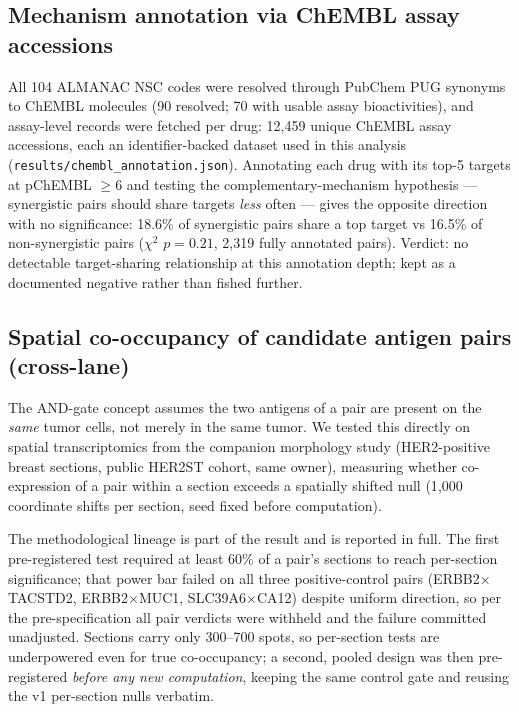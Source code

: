 \documentclass[11pt]{article}
\begin{document}
\subsection{Mechanism annotation via ChEMBL assay accessions}
All 104 ALMANAC NSC codes were resolved through PubChem PUG synonyms to ChEMBL
molecules (90 resolved; 70 with usable assay bioactivities), and assay-level
records were fetched per drug: 12{,}459 unique ChEMBL assay accessions, each an
identifier-backed dataset used in this analysis
(\texttt{results/chembl\_annotation.json}). Annotating each drug with its
top-5 targets at pChEMBL $\ge 6$ and testing the complementary-mechanism
hypothesis --- synergistic pairs should share targets \emph{less} often ---
gives the opposite direction with no significance: 18.6\% of synergistic pairs
share a top target vs 16.5\% of non-synergistic pairs ($\chi^2$ $p=0.21$,
2{,}319 fully annotated pairs). Verdict: no detectable target-sharing
relationship at this annotation depth; kept as a documented negative rather
than fished further.
\subsection{Spatial co-occupancy of candidate antigen pairs (cross-lane)}
The AND-gate concept assumes the two antigens of a pair are present on the
\emph{same} tumor cells, not merely in the same tumor. We tested this directly
on spatial transcriptomics from the companion morphology study (HER2-positive
breast sections, public HER2ST cohort, same owner), measuring whether
co-expression of a pair within a section exceeds a spatially shifted null
(1{,}000 coordinate shifts per section, seed fixed before computation).

The methodological lineage is part of the result and is reported in full. The
first pre-registered test required at least 60\% of a pair's sections to reach
per-section significance; that power bar failed on all three positive-control
pairs (ERBB2$\times$TACSTD2, ERBB2$\times$MUC1, SLC39A6$\times$CA12) despite
uniform direction, so per the pre-specification all pair verdicts were withheld
and the failure committed unadjusted. Sections carry only 300--700 spots, so
per-section tests are underpowered even for true co-occupancy; a second,
pooled design was then pre-registered \emph{before any new computation},
keeping the same control gate and reusing the v1 per-section nulls verbatim.
\end{document}
